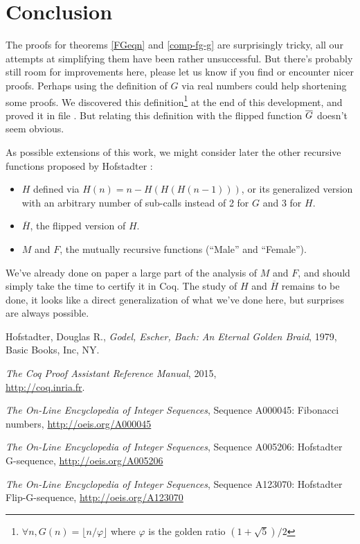 \documentclass[a4paper,11pt]{article}
\begin{document}
\section{Conclusion}

The proofs for theorems \ref{FGeqn} and \ref{comp-fg-g} are
surprisingly tricky, all our attempts at simplifying them
have been rather unsuccessful. But there's probably still room
for improvements here, please let us know if you find or
encounter nicer proofs. Perhaps using the definition of $G$
via real numbers could help shortening some proofs.
We discovered this definition\footnote{
$\forall n, G(n)=\lfloor n/\varphi\rfloor$ where $\varphi$
is the golden ratio $(1+\sqrt{5})/2$}
at the end of this development, and proved it in file .
But relating this definition with the flipped function $\overline{G}$
doesn't seem obvious.

As possible extensions of this work, we might consider later
the other recursive functions proposed by Hofstadter :
\begin{itemize}
\item $H$ defined via $H(n)=n-H(H(H(n-1)))$, or its generalized
   version with an arbitrary number of sub-calls instead of 2
   for $G$ and 3 for $H$.
\item $\overline{H}$, the flipped version of $H$.
\item $M$ and $F$, the mutually recursive functions (``Male''
and ``Female'').
\end{itemize}
We've already done on paper a large part of the analysis of
$M$ and $F$, and should simply take the time to certify
it in Coq. The study of $H$ and $\overline{H}$ remains to be
done, it looks like a direct generalization of what we've
done here, but surprises are always possible.

\begin{thebibliography}{1}
 Hofstadter, Douglas R.,
 {\it Godel, Escher, Bach: An Eternal Golden Braid},
 1979, Basic Books, Inc, NY.

 {\it The Coq Proof Assistant Reference Manual}, 2015,\\
 \mbox{\url{http://coq.inria.fr}}.

 {\it The On-Line Encyclopedia of Integer Sequences}, Sequence
 A000045: Fibonacci numbers, \url{http://oeis.org/A000045}

 {\it The On-Line Encyclopedia of Integer Sequences}, Sequence
 A005206: Hofstadter G-sequence, \url{http://oeis.org/A005206}

 {\it The On-Line Encyclopedia of Integer Sequences}, Sequence
 A123070: Hofstadter Flip-G-sequence, \url{http://oeis.org/A123070}

\end{thebibliography}
\end{document}
